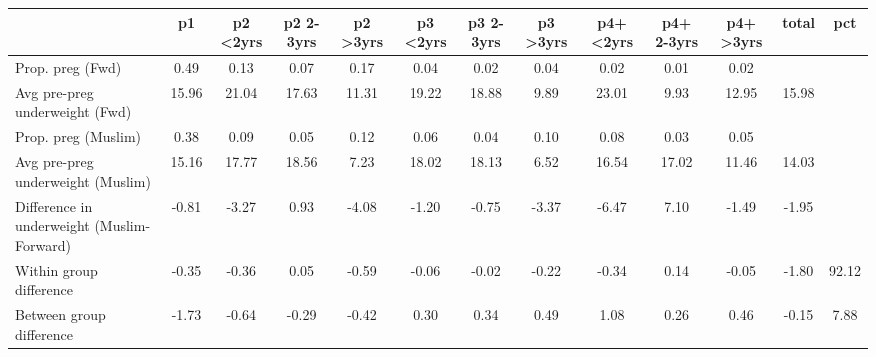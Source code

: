 \begin{tabular}{l*{12}{c}}
\toprule
            &\multicolumn{1}{c}{p1}&\multicolumn{1}{c}{p2 \textless2yrs}&\multicolumn{1}{c}{p2 2-3yrs}&\multicolumn{1}{c}{p2 \textgreater3yrs}&\multicolumn{1}{c}{p3 \textless2yrs}&\multicolumn{1}{c}{p3 2-3yrs}&\multicolumn{1}{c}{p3 \textgreater3yrs}&\multicolumn{1}{c}{p4+ \textless2yrs}&\multicolumn{1}{c}{p4+ 2-3yrs}&\multicolumn{1}{c}{p4+ \textgreater3yrs}&\multicolumn{1}{c}{total}&\multicolumn{1}{c}{pct}\\
\midrule
\midrule
Prop. preg (Fwd)&        0.49&        0.13&        0.07&        0.17&        0.04&        0.02&        0.04&        0.02&        0.01&        0.02&            &            \\
Avg pre-preg underweight (Fwd)&       15.96&       21.04&       17.63&       11.31&       19.22&       18.88&        9.89&       23.01&        9.93&       12.95&       15.98&            \\
Prop. preg (Muslim)&        0.38&        0.09&        0.05&        0.12&        0.06&        0.04&        0.10&        0.08&        0.03&        0.05&            &            \\
Avg pre-preg underweight (Muslim)&       15.16&       17.77&       18.56&        7.23&       18.02&       18.13&        6.52&       16.54&       17.02&       11.46&       14.03&            \\
Difference in underweight (Muslim-Forward)&       -0.81&       -3.27&        0.93&       -4.08&       -1.20&       -0.75&       -3.37&       -6.47&        7.10&       -1.49&       -1.95&            \\
Within group difference&       -0.35&       -0.36&        0.05&       -0.59&       -0.06&       -0.02&       -0.22&       -0.34&        0.14&       -0.05&       -1.80&       92.12\\
Between group difference&       -1.73&       -0.64&       -0.29&       -0.42&        0.30&        0.34&        0.49&        1.08&        0.26&        0.46&       -0.15&        7.88\\
\bottomrule
\end{tabular}

